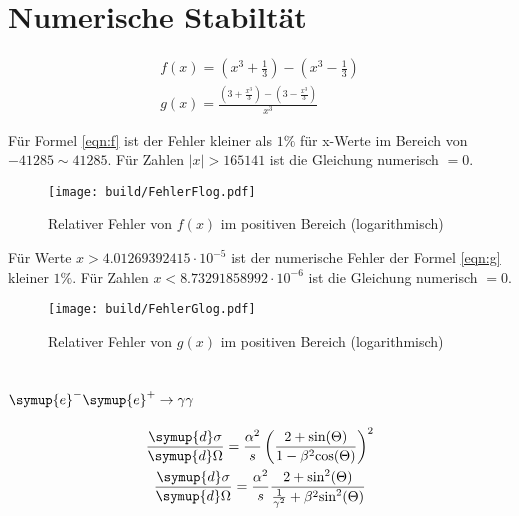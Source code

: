 



\section{Numerische Stabiltät}

\begin{gather}
  f(x)=\left(x^3+\frac{1}{3}\right)-\left(x^3-\frac{1}{3}\right)\label{eqn:f}\\
  g(x)=\frac{\left(3+\frac{x^3}{3}\right)-\left(3-\frac{x^3}{3}\right)}{x^3}\label{eqn:g}
\end{gather}

Für Formel \eqref{eqn:f} ist der Fehler kleiner als $1\%$ für x-Werte im Bereich von $-41285 \sim 41285$.
Für Zahlen $|x|>165141$ ist die Gleichung numerisch $=0$.

\begin{figure}
  \centering
  \texttt{[image: build/FehlerFlog.pdf]}
  \caption{Relativer Fehler von $f(x)$ im positiven Bereich (logarithmisch)}
  \label{fig:FehlerFlog}
\end{figure}

Für Werte $x>4.01269392415 \cdot 10^{-5}$ ist der numerische Fehler der Formel \eqref{eqn:g} kleiner $1\%$.
Für Zahlen $x<8.73291858992 \cdot 10^{-6}$ ist die Gleichung numerisch $=0$.

\begin{figure}
  \centering
  \texttt{[image: build/FehlerGlog.pdf]}
  \caption{Relativer Fehler von $g(x)$ im positiven Bereich (logarithmisch)}
  \label{fig:FehlerGlog}
\end{figure}

\section{\texorpdfstring{$\symup{e}^-\symup{e}^+\rightarrow\gamma \gamma$}{Paarvernichtung}}

\begin{gather}
    \frac{\symup{d}\sigma}{\symup{d}\Omega} = \frac{\alpha^2}{s} \left(\frac{2+\text{sin}(\Theta)}{1-\beta^2 \text{cos}(\Theta)}\right)^2\label{eqn:WQStandard}\\
    \frac{\symup{d}\sigma}{\symup{d}\Omega} =  \frac{\alpha^2}{s} \frac{2+\text{sin}^2(\Theta)}{\frac{1}{\gamma^2}+\beta^2 \text{sin}^2(\Theta)}\label{eqn:WQModifiziert}
\end{gather}


